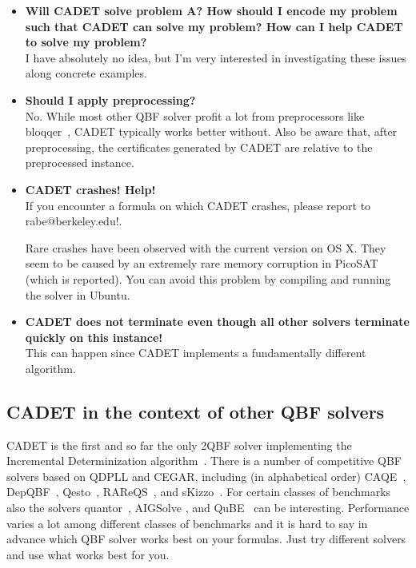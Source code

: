 \documentclass{article}
\begin{document}
\begin{itemize}
	\item {\bf Will CADET solve problem A? How should I encode my problem such that CADET can solve my problem? How can I help CADET to solve my problem?}\\[10pt]
		I have absolutely no idea, but I'm very interested in investigating these issues along concrete examples. 
	\item {\bf Should I apply preprocessing?} \\[10pt]
		No. While most other QBF solver profit a lot from preprocessors like bloqqer~\cite{BiereLS/2011/QBCE_Bloqqer}, CADET typically works better without. 
		Also be aware that, after preprocessing, the certificates generated by CADET are relative to the preprocessed instance. 
	\item {\bf CADET crashes! Help!}  \\[8pt]
		If you encounter a formula on which CADET crashes, please report to rabe@berkeley.edu!. 
		
		Rare crashes have been observed with the current version on OS X. They seem to be caused by an extremely rare memory corruption in PicoSAT (which is reported). 
		You can avoid this problem by compiling and running the solver in Ubuntu.
		
	\item {\bf CADET does not terminate even though all other solvers terminate quickly on this instance!} \\[8pt]
		This can happen since CADET implements a fundamentally different algorithm. 
\end{itemize}

\subsection{CADET in the context of other QBF solvers}

CADET is the first and so far the only 2QBF solver implementing the Incremental Determinization algorithm~\cite{RabeSeshia/2016/IncrementalDeterminization}. 
There is a number of competitive QBF solvers based on QDPLL and CEGAR, including (in alphabetical order) CAQE~\cite{RabeTentrup/2015/CAQEACertifyingQBFSolver}, DepQBF~\cite{LonsingBiere/2010/DepQBF}, Qesto~\cite{JanotaM/2015/SolvingQBFByClauseSelection}, RAReQS~\cite{JanotaSilva/2011/AbstractionBasedAlgorithmFor2QBF,JanotaKMC/2012/QBFWithCEGAR}, and sKizzo~\cite{Benedetti/2005/sKizzo}. 
For certain classes of benchmarks also the solvers quantor~\cite{Biere/2004/ResolveAndExpand}, AIGSolve \cite{PigorschScholl/2010/AIGSolve}, and QuBE~\cite{GiunchigliaNT/2001/QuBE} can be interesting. 
Performance varies a lot among different classes of benchmarks and it is hard to say in advance which QBF solver works best on your formulas. 
Just try different solvers and use what works best for you.
\end{document}
